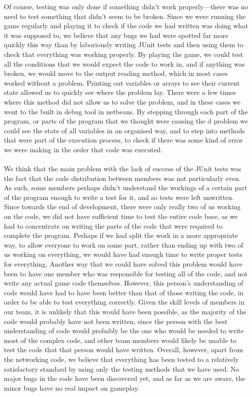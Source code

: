 Of course, testing was only done if something didn't work properly---there was no need to test something that didn't seem to be broken. Since we were running the game regularly and playing it to check if the code we had written was doing what it was supposed to, we believe that any bugs we had were spotted far more quickly this way than by laboriously writing JUnit tests and then using them to check that everything was working properly. By playing the game, we could test all the conditions that we would expect the code to work in, and if anything was broken, we would move to the output reading method, which in most cases worked without a problem. Printing out variables or arrays to see their current state allowed us to quickly see where the problem lay. There were a few times where this method did not allow us to solve the problem, and in these cases we went to the built in debug tool in netbeans. By stepping through each part of the program, or parts of the program that we thought were causing the d problem we could see the state of all variables in an organised way, and to step into methods that were part of the execution process, to check if there was some kind of error we were making in the order that code was executed.\\\\
We think that the main problem with the lack of success of the JUnit tests was the fact that the code distribution between members was not particularly even. As such, some members perhaps didn't understand the workings of a certain part of the program enough to write a test for it, and so tests were left unwritten. Since towards the end of development, there were only really two of us working on the code, we did not have sufficient time to test the entire code base, as we had to concentrate on writing the parts of the code that were required to complete the program. Perhaps if we had split the work in a more appropriate way, to allow everyone to work on some part, rather than ending up with two of us working on everything, we would have had enough time to write proper tests for everything. Another way that we could have solved this problem would have been to have one member who was responsible for testing all of the code, and not write any actual game code themselves. However, this person's understanding of code would have had to have been better than that of those writing the code, in order to be able to test everything correctly. Given the skill levels of members in our team, it is unlikely that this would have been possible, as the majority of the code would probably have not been written, since the person with the best understanding of code would probably be the one who would be needed to write most of the complex code, and other team members would likely be unable to test the code that that person would have written. Overall, however, apart from the networking code, we believe that everything has been tested to a relatively satisfactory standard by using only the testing methods that we have used. No major bugs in the code have been discovered yet, and as far as we are aware, the minor bugs have no real impact on gameplay.
